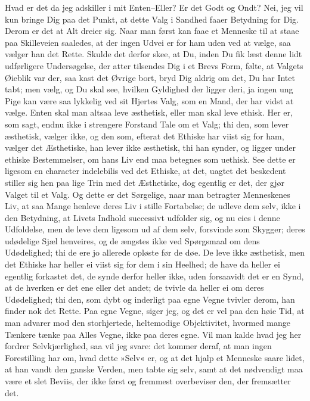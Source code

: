 \documentclass[12pt,a4paper]{article}
\begin{document}
Hvad er det da jeg adskiller i mit Enten–Eller? Er det Godt og Ondt? Nei, jeg vil kun bringe Dig paa det Punkt, at dette Valg i Sandhed faaer Betydning for Dig. Derom er det at Alt dreier sig. Naar man først kan faae et Menneske til at staae paa Skilleveien saaledes, at der ingen Udvei er for ham uden ved at vælge, saa vælger han det Rette. Skulde det derfor skee, at Du, inden Du fik læst denne lidt udførligere Undersøgelse, der atter tilsendes Dig i et Brevs Form, følte, at Valgets Øieblik var der, saa kast det Øvrige bort, bryd Dig aldrig om det, Du har Intet tabt; men vælg, og Du skal see, hvilken Gyldighed der ligger deri, ja ingen ung Pige kan være saa lykkelig ved sit Hjertes Valg, som en Mand, der har vidst at vælge. Enten skal man altsaa leve æsthetisk, eller man skal leve ethisk. Her er, som sagt, endnu ikke i strengere Forstand Tale om et Valg; thi den, som lever æsthetisk, vælger ikke, og den som, efterat det Ethiske har viist sig for ham, vælger det Æsthetiske, han lever ikke æsthetisk, thi han synder, og ligger under ethiske Bestemmelser, om hans Liv end maa betegnes som uethisk. See dette er ligesom en character indelebilis ved det Ethiske, at det, uagtet det beskedent stiller sig hen paa lige Trin med det Æsthetiske, dog egentlig er det, der gjør Valget til et Valg. Og dette er det Sørgelige, naar man betragter Menneskenes Liv, at saa Mange henleve deres Liv i stille Fortabelse; de udleve dem selv, ikke i den Betydning, at Livets Indhold successivt udfolder sig, og nu eies i denne Udfoldelse, men de leve dem ligesom ud af dem selv, forsvinde som Skygger; deres udødelige Sjæl henveires, og de ængstes ikke ved Spørgsmaal om dens Udødelighed; thi de ere jo allerede opløste før de døe. De leve ikke æsthetisk, men det Ethiske har heller ei viist sig for dem i sin Heelhed; de have da heller ei egentlig forkastet det, de synde derfor heller ikke, uden forsaavidt det er en Synd, at de hverken er det ene eller det andet; de tvivle da heller ei om deres Udødelighed; thi den, som dybt og inderligt paa egne Vegne tvivler derom, han finder nok det Rette. Paa egne Vegne, siger jeg, og det er vel paa den høie Tid, at man advarer mod den storhjertede, heltemodige Objektivitet, hvormed mange Tænkere tænke paa Alles Vegne, ikke paa deres egne. Vil man kalde hvad jeg her fordrer Selvkjærlighed, saa vil jeg svare: det kommer deraf, at man ingen Forestilling har om, hvad dette »Selv« er, og at det hjalp et Menneske saare lidet, at han vandt den ganske Verden, men tabte sig selv, samt at det nødvendigt maa være et slet Beviis, der ikke først og fremmest overbeviser den, der fremsætter det.
\end{document}
